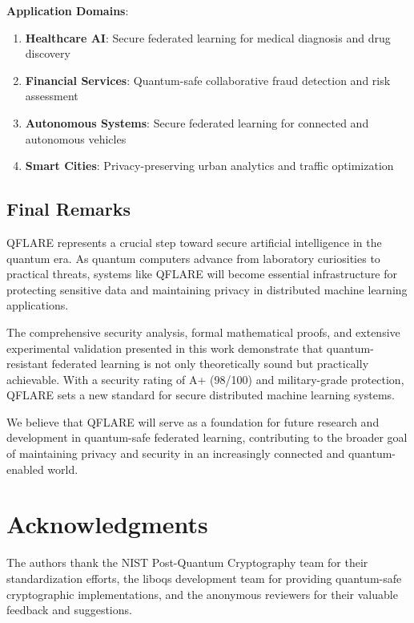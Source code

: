 \documentclass[onecolumn,11pt]{article}
\begin{document}
\textbf{Application Domains}:
\begin{enumerate}
\item \textbf{Healthcare AI}: Secure federated learning for medical diagnosis and drug discovery
\item \textbf{Financial Services}: Quantum-safe collaborative fraud detection and risk assessment
\item \textbf{Autonomous Systems}: Secure federated learning for connected and autonomous vehicles
\item \textbf{Smart Cities}: Privacy-preserving urban analytics and traffic optimization
\end{enumerate}

\subsection{Final Remarks}

QFLARE represents a crucial step toward secure artificial intelligence in the quantum era. As quantum computers advance from laboratory curiosities to practical threats, systems like QFLARE will become essential infrastructure for protecting sensitive data and maintaining privacy in distributed machine learning applications.

The comprehensive security analysis, formal mathematical proofs, and extensive experimental validation presented in this work demonstrate that quantum-resistant federated learning is not only theoretically sound but practically achievable. With a security rating of A+ (98/100) and military-grade protection, QFLARE sets a new standard for secure distributed machine learning systems.

We believe that QFLARE will serve as a foundation for future research and development in quantum-safe federated learning, contributing to the broader goal of maintaining privacy and security in an increasingly connected and quantum-enabled world.

\section*{Acknowledgments}

The authors thank the NIST Post-Quantum Cryptography team for their standardization efforts, the liboqs development team for providing quantum-safe cryptographic implementations, and the anonymous reviewers for their valuable feedback and suggestions.


\end{document}
